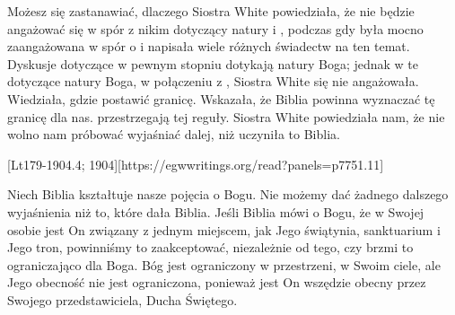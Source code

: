 Możesz się zastanawiać, dlaczego Siostra White powiedziała, że nie będzie angażować się w spór z nikim dotyczący natury i , podczas gdy była mocno zaangażowana w spór o  i napisała wiele różnych świadectw na ten temat. Dyskusje dotyczące  w pewnym stopniu dotykają natury Boga; jednak w te dotyczące natury Boga, w połączeniu z , Siostra White się nie angażowała. Wiedziała, gdzie postawić granicę. Wskazała, że Biblia powinna wyznaczać tę granicę dla nas.   przestrzegają tej reguły. Siostra White powiedziała nam, że nie wolno nam próbować wyjaśniać  dalej, niż uczyniła to Biblia.

[Lt179-1904.4; 1904][https://egwwritings.org/read?panels=p7751.11]

Niech Biblia kształtuje nasze pojęcia o Bogu. Nie możemy dać żadnego dalszego wyjaśnienia  niż to, które dała Biblia. Jeśli Biblia mówi o Bogu, że w Swojej osobie jest On związany z jednym miejscem, jak Jego świątynia, sanktuarium i Jego tron, powinniśmy to zaakceptować, niezależnie od tego, czy brzmi to ograniczająco dla Boga. Bóg jest ograniczony w przestrzeni, w Swoim ciele, ale Jego obecność nie jest ograniczona, ponieważ jest On wszędzie obecny przez Swojego przedstawiciela, Ducha Świętego.

